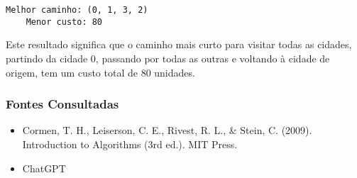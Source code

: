 \documentclass{article}
\begin{document}
\begin{lstlisting}[style=mypython]
    Melhor caminho: (0, 1, 3, 2)
    Menor custo: 80
\end{lstlisting}

Este resultado significa que o caminho mais curto para visitar 
todas as cidades, partindo da cidade 0, passando por todas as 
outras e voltando à cidade de origem, tem um custo total de 80 
unidades.

\subsubsection{Fontes Consultadas}
\begin{itemize}
    \item Cormen, T. H., Leiserson, C. E., Rivest, R. L., \& Stein, C. (2009). Introduction to Algorithms (3rd ed.). MIT Press.
    \item ChatGPT
\end{itemize}
\end{document}
